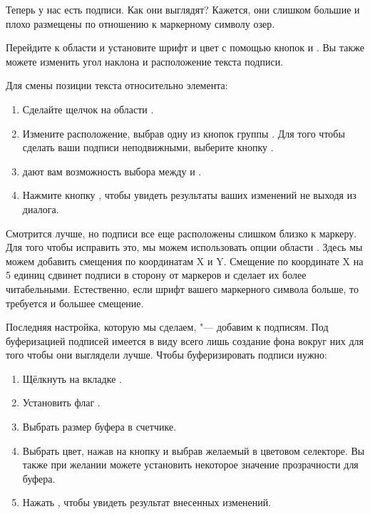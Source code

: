 Теперь у нас есть подписи. Как они выглядят? Кажется, они слишком большие
и плохо размещены по отношению к маркерному символу озер.

Перейдите к области  и установите шрифт и цвет с помощью кнопок
 и . Вы также можете изменить угол наклона и
расположение текста подписи.

Для смены позиции текста относительно элемента:

\begin{enumerate}
\item Сделайте щелчок на области .
\item Измените расположение, выбрав одну из кнопок группы .
Для того чтобы сделать ваши подписи неподвижными, выберите кнопку .
\item {} дают вам возможность
выбора между  и .
\item Нажмите кнопку , чтобы увидеть результаты ваших
изменений не выходя из диалога.
\end{enumerate}

Смотрится лучше, но подписи все еще расположены слишком близко к маркеру.
Для того чтобы исправить это, мы можем использовать опции области .
Здесь мы можем добавить смещения по координатам X и Y. Смещение по координате
X на 5 единиц сдвинет подписи в сторону от маркеров и сделает их более
читабельными. Естественно, если шрифт вашего маркерного символа больше,
то требуется и большее смещение.

Последняя настройка, которую мы сделаем, "--- добавим  к подписям.
Под буферизацией подписей имеется в виду всего лишь создание фона вокруг
них для того чтобы они выглядели лучше. Чтобы буферизировать подписи нужно:

\begin{enumerate}
\item Щёлкнуть на вкладке .
\item Установить флаг .
\item Выбрать размер буфера в счетчике.
\item Выбрать цвет, нажав на кнопку  и выбрав желаемый в
цветовом селекторе. Вы также при желании можете установить некоторое значение
прозрачности для буфера.
\item Нажать , чтобы увидеть результат внесенных изменений.
\end{enumerate}


